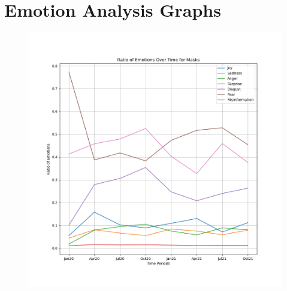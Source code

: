\documentclass{l4proj}
\begin{document}
\begin{appendices}
\begin{figure}[H]
\begin{minipage}[c]{0.49\linewidth}
\label{fig:polsen}
\end{minipage}
\end{figure}

\chapter{Emotion Analysis Graphs}

\begin{figure}[H]
\begin{minipage}[c]{0.49\linewidth}
\centering
\includegraphics[width=\textwidth]{images/MasksEmotion.png}
\label{fig:maskemo}
\end{minipage}\hfill
\begin{minipage}[c]{0.49\linewidth}
\centering

\end{minipage}
\end{figure}
\end{appendices}
\end{document}
